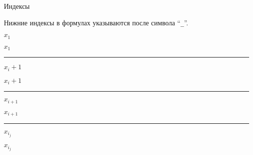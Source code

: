 
\begin{frame}[fragile]{Индексы}
	\Large
	
	Нижние индексы в формулах указываются после символа ``\texttt{_}''.
	
	\begin{minipage}{0.49\textwidth}
		\texttt{$x_1$}
	\end{minipage}
	\begin{minipage}{0.49\textwidth}
		\begin{center}
			$x_1$
		\end{center}
	\end{minipage}
	\noindent\rule{\textwidth}{1pt}
	\begin{minipage}{0.49\textwidth}
		\texttt{$x_i+1$}
	\end{minipage}
	\begin{minipage}{0.49\textwidth}
		\begin{center}
			$x_i+1$
		\end{center}
	\end{minipage}
	\noindent\rule{\textwidth}{1pt}
	\begin{minipage}{0.49\textwidth}
		\texttt{$x_{i+1}$}
	\end{minipage}
	\begin{minipage}{0.49\textwidth}
		\begin{center}
			$x_{i+1}$
		\end{center}
	\end{minipage}
	\noindent\rule{\textwidth}{1pt}
	\begin{minipage}{0.49\textwidth}
		\texttt{$x_{i_j}$}
	\end{minipage}
	\begin{minipage}{0.49\textwidth}
		\begin{center}
			$x_{i_j}$
		\end{center}
	\end{minipage}
\end{frame}

